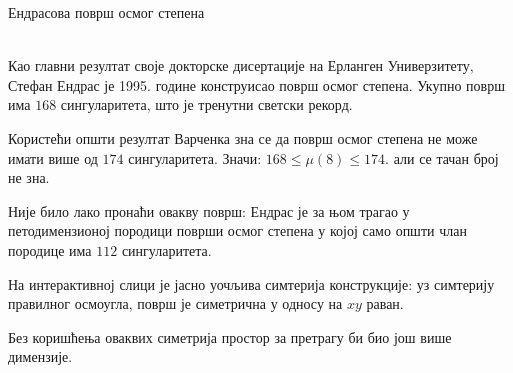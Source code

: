 \documentclass[sr]{./../../common/SurferDesc}%
\begin{document}
\footnotesize




\begin{surferPage}
  \begin{surferTitle}Ендрасова површ осмог степена\end{surferTitle} \\
    Као главни резултат своје докторске дисертације на Ерланген Универзитету, 
	Стефан Ендрас је 1995. године конструисао површ осмог степена.
    Укупно површ има $168$ сингуларитета, што је тренутни светски рекорд. 
  
    Користећи општи резултат Варченка зна се да површ осмог степена не може имати 
    више од  $174$ сингуларитета.
    Значи: $168 \le \mu(8) \le 174$. 
    али се тачан број не зна.

    Није било лако пронаћи овакву површ: Ендрас је за њом трагао у петодимензионој 
    породици површи осмог степена у којој само општи члан породице има 
    $112$ сингуларитета.

    На интерактивној слици је јасно уочљива симтерија конструкције: 
    уз симтерију правилног осмоугла, површ је симетрична у односу на $xy$ раван.

    Без коришћења оваквих симетрија простор за претрагу би био још више димензије.
  \begin{surferText}
     \end{surferText}
\end{surferPage}
\end{document}
